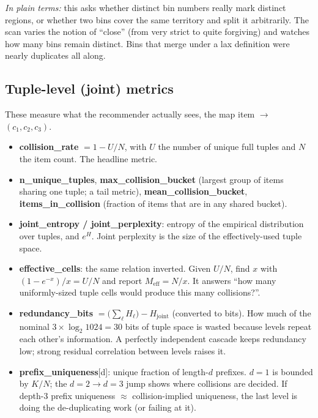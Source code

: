 \documentclass[11pt]{article}
\begin{document}
\emph{In plain terms:} this asks whether distinct bin numbers really mark
distinct regions, or whether two bins cover the same territory and split it
arbitrarily. The scan varies the notion of ``close'' (from very strict to quite
forgiving) and watches how many bins remain distinct. Bins that merge under a
lax definition were nearly duplicates all along.

\subsection{Tuple-level (joint) metrics}

These measure what the recommender actually sees, the map item $\to$ $(c_1,c_2,c_3)$.

\begin{itemize}[nosep]
  \item \textbf{collision\_rate} $= 1 - U/N$, with $U$ the number of unique
  full tuples and $N$ the item count. The headline metric.
  \item \textbf{n\_unique\_tuples}, \textbf{max\_collision\_bucket} (largest
  group of items sharing one tuple; a tail metric), \textbf{mean\_collision\_bucket},
  \textbf{items\_in\_collision} (fraction of items that are in any shared bucket).
  \item \textbf{joint\_entropy / joint\_perplexity}: entropy of the empirical
  distribution over tuples, and $e^H$. Joint perplexity is the size of the
  effectively-used tuple space.
  \item \textbf{effective\_cells}: the same relation inverted. Given $U/N$, find
  $x$ with $(1 - e^{-x})/x = U/N$ and report $M_{\mathrm{eff}} = N/x$. It
  answers ``how many uniformly-sized tuple cells would produce this many
  collisions?''.
  \item \textbf{redundancy\_bits} $= \bigl(\sum_\ell H_\ell\bigr) - H_{\mathrm{joint}}$
  (converted to bits). How much of the nominal $3 \times \log_2 1024 = 30$ bits
  of tuple space is wasted because levels repeat each other's information.
  A perfectly independent cascade keeps redundancy low; strong residual
  correlation between levels raises it.
  \item \textbf{prefix\_uniqueness}[d]: unique fraction of length-$d$ prefixes.
  $d=1$ is bounded by $K/N$; the $d=2 \to d=3$ jump shows where collisions are
  decided. If depth-3 prefix uniqueness $\approx$ collision-implied uniqueness,
  the last level is doing the de-duplicating work (or failing at it).
\end{itemize}
\end{document}
